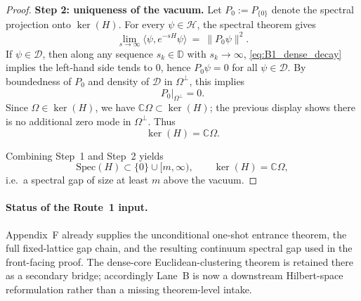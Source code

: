 \begin{proof}
\smallskip
\noindent\textbf{Step 2: uniqueness of the vacuum.}
Let $P_0:=P_{\{0\}}$ denote the spectral projection onto $\ker(H)$.
For every $\psi\in\mathcal H$, the spectral theorem gives
\[
\lim_{s\to\infty}\langle \psi,e^{-sH}\psi\rangle\ =\ \|P_0\psi\|^2.
\]
If $\psi\in\mathcal D$, then along any sequence $s_k\in\mathbb D$ with $s_k\to\infty$, \eqref{eq:B1_dense_decay} implies the left-hand side tends to $0$, hence $P_0\psi=0$ for all $\psi\in\mathcal D$.
By boundedness of $P_0$ and density of $\mathcal D$ in $\Omega^\perp$, this implies
\[
P_0\big|_{\Omega^\perp}=0.
\]
Since $\Omega\in\ker(H)$, we have $\mathbb C\Omega\subset \ker(H)$; the previous display shows there is no additional zero mode in $\Omega^\perp$.
Thus
\[
\ker(H)=\mathbb C\Omega.
\]

Combining Step~1 and Step~2 yields
\[
\mathrm{Spec}(H)\subset \{0\}\cup[m,\infty),\qquad \ker(H)=\mathbb C\Omega,
\]
i.e.\ a spectral gap of size at least $m$ above the vacuum.
\end{proof}

\paragraph{Status of the Route~1 input.}
Appendix~F already supplies the unconditional one-shot entrance theorem, the full fixed-lattice gap chain, and the resulting continuum spectral gap used in the front-facing proof.
The dense-core Euclidean-clustering theorem is retained there as a secondary bridge; accordingly Lane~B is now a downstream Hilbert-space reformulation rather than a missing theorem-level intake.
